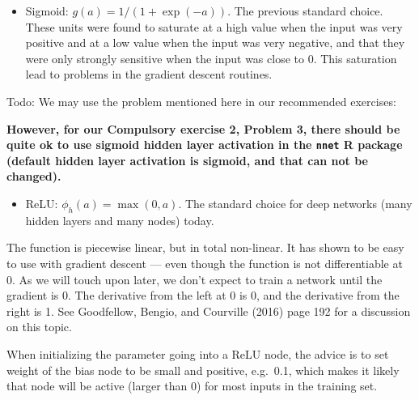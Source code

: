 \documentclass[10pt,ignorenonframetext,]{beamer}
\providecommand{\tightlist}{%
  \setlength{\itemsep}{0pt}\setlength{\parskip}{0pt}}
\begin{document}
\begin{frame}[fragile]

\begin{itemize}
\tightlist
\item
  Sigmoid: \(g(a)=1/(1+\exp(-a))\). The previous standard choice. These
  units were found to saturate at a high value when the input was very
  positive and at a low value when the input was very negative, and that
  they were only strongly sensitive when the input was close to 0. This
  saturation lead to problems in the gradient descent routines.
\end{itemize}

Todo: We may use the problem mentioned here in our recommended
exercises:

\textbf{However, for our Compulsory exercise 2, Problem 3, there should
be quite ok to use sigmoid hidden layer activation in the \texttt{nnet}
R package (default hidden layer activation is sigmoid, and that can not
be changed).}

\end{frame}

\begin{frame}

\begin{itemize}
\tightlist
\item
  ReLU: \(\phi_h(a)=\max(0,a)\). The standard choice for deep networks
  (many hidden layers and many nodes) today.
\end{itemize}

The function is piecewise linear, but in total non-linear. It has shown
to be easy to use with gradient descent --- even though the function is
not differentiable at 0. As we will touch upon later, we don't expect to
train a network until the gradient is 0. The derivative from the left at
0 is 0, and the derivative from the right is 1. See Goodfellow, Bengio,
and Courville (2016) page 192 for a discussion on this topic.

When initializing the parameter going into a ReLU node, the advice is to
set weight of the bias node to be small and positive, e.g.~0.1, which
makes it likely that node will be active (larger than 0) for most inputs
in the training set.

\end{frame}
\end{document}
